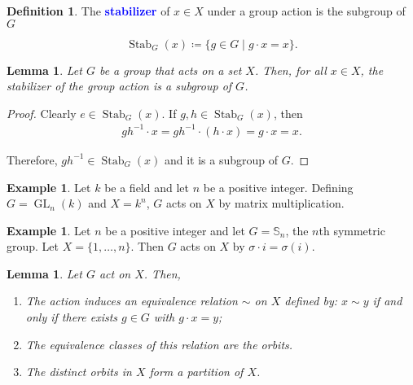 \documentclass[12pt]{report}
\newcommand{\indx}[1]{\index{#1}\textbf{\textcolor{blue}{#1}}}
\newcommand{\Stab}{\operatorname{Stab}}
\newtheorem{lemma}[theorem]{Lemma}
\theoremstyle{definition}
\newtheorem{definition}[theorem]{Definition}
\newtheorem{example}[theorem]{Example}
\newcommand{\GL}{\operatorname{GL}}
\begin{document}
\begin{definition}\label{def:group-theory:stabilizer}
  The \indx{stabilizer} of \(x \in X\) under a group action is the subgroup of \(G\)

  \[\Stab_{G}(x) \coloneqq \{ g \in G \mid g \cdot x = x \}.\]
\end{definition}

\begin{lemma}\label{lem:group-theory:stabilizer-is-subgroup}
  Let \(G\) be a group that acts on a set \(X\). Then, for all \(x \in X\), the stabilizer of the group action is a subgroup of \(G\).
\end{lemma}

\begin{proof}
  Clearly \(e \in \Stab_{G}(x)\). If \(g, h \in \Stab_{G}(x)\), then
  \begin{align*}
    gh^{-1} \cdot x = gh^{-1} \cdot (h \cdot x) = g \cdot x = x.
  \end{align*}

  Therefore, \(gh^{-1} \in \Stab_{G}(x)\) and it is a subgroup of \(G\).
\end{proof}

\begin{example}
  Let \(k\) be a field and let \(n\) be a positive integer. Defining \(G = \GL_{n}(k)\) and \(X = k^{n}\), \(G\) acts on \(X\) by matrix multiplication.
\end{example}

\begin{example}
  Let \(n\) be a positive integer and let \(G = \mathbb S_{n}\), the \(n\)th symmetric group. Let \(X = \{1, \ldots, n\}\). Then \(G\) acts on \(X\) by \(\sigma \cdot i = \sigma(i)\).
\end{example}


\begin{lemma}\label{lem:group-theory:orbits-partition}
  Let \(G\) act on \(X\). Then,
  \begin{enumerate}
    \item The action induces an equivalence relation \(\sim\) on \(X\) defined by: \(x \sim y\) if and only if there exists \(g \in G\) with \(g \cdot x = y\);
    \item The equivalence classes of this relation are the orbits.
    \item The distinct orbits in \(X\) form a partition of \(X\).
  \end{enumerate}
\end{lemma}
\end{document}
